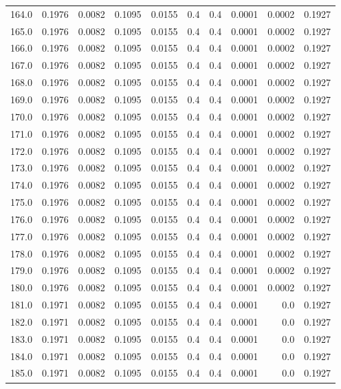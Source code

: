 \begin{longtable}{lrrrrrrrrr}
164.0 & 0.1976 & 0.0082 & 0.1095 & 0.0155 & 0.4 & 0.4 & 0.0001 & 0.0002 & 0.1927 \\
165.0 & 0.1976 & 0.0082 & 0.1095 & 0.0155 & 0.4 & 0.4 & 0.0001 & 0.0002 & 0.1927 \\
166.0 & 0.1976 & 0.0082 & 0.1095 & 0.0155 & 0.4 & 0.4 & 0.0001 & 0.0002 & 0.1927 \\
167.0 & 0.1976 & 0.0082 & 0.1095 & 0.0155 & 0.4 & 0.4 & 0.0001 & 0.0002 & 0.1927 \\
168.0 & 0.1976 & 0.0082 & 0.1095 & 0.0155 & 0.4 & 0.4 & 0.0001 & 0.0002 & 0.1927 \\
169.0 & 0.1976 & 0.0082 & 0.1095 & 0.0155 & 0.4 & 0.4 & 0.0001 & 0.0002 & 0.1927 \\
170.0 & 0.1976 & 0.0082 & 0.1095 & 0.0155 & 0.4 & 0.4 & 0.0001 & 0.0002 & 0.1927 \\
171.0 & 0.1976 & 0.0082 & 0.1095 & 0.0155 & 0.4 & 0.4 & 0.0001 & 0.0002 & 0.1927 \\
172.0 & 0.1976 & 0.0082 & 0.1095 & 0.0155 & 0.4 & 0.4 & 0.0001 & 0.0002 & 0.1927 \\
173.0 & 0.1976 & 0.0082 & 0.1095 & 0.0155 & 0.4 & 0.4 & 0.0001 & 0.0002 & 0.1927 \\
174.0 & 0.1976 & 0.0082 & 0.1095 & 0.0155 & 0.4 & 0.4 & 0.0001 & 0.0002 & 0.1927 \\
175.0 & 0.1976 & 0.0082 & 0.1095 & 0.0155 & 0.4 & 0.4 & 0.0001 & 0.0002 & 0.1927 \\
176.0 & 0.1976 & 0.0082 & 0.1095 & 0.0155 & 0.4 & 0.4 & 0.0001 & 0.0002 & 0.1927 \\
177.0 & 0.1976 & 0.0082 & 0.1095 & 0.0155 & 0.4 & 0.4 & 0.0001 & 0.0002 & 0.1927 \\
178.0 & 0.1976 & 0.0082 & 0.1095 & 0.0155 & 0.4 & 0.4 & 0.0001 & 0.0002 & 0.1927 \\
179.0 & 0.1976 & 0.0082 & 0.1095 & 0.0155 & 0.4 & 0.4 & 0.0001 & 0.0002 & 0.1927 \\
180.0 & 0.1976 & 0.0082 & 0.1095 & 0.0155 & 0.4 & 0.4 & 0.0001 & 0.0002 & 0.1927 \\
181.0 & 0.1971 & 0.0082 & 0.1095 & 0.0155 & 0.4 & 0.4 & 0.0001 & 0.0 & 0.1927 \\
182.0 & 0.1971 & 0.0082 & 0.1095 & 0.0155 & 0.4 & 0.4 & 0.0001 & 0.0 & 0.1927 \\
183.0 & 0.1971 & 0.0082 & 0.1095 & 0.0155 & 0.4 & 0.4 & 0.0001 & 0.0 & 0.1927 \\
184.0 & 0.1971 & 0.0082 & 0.1095 & 0.0155 & 0.4 & 0.4 & 0.0001 & 0.0 & 0.1927 \\
185.0 & 0.1971 & 0.0082 & 0.1095 & 0.0155 & 0.4 & 0.4 & 0.0001 & 0.0 & 0.1927 \\

\end{longtable}
